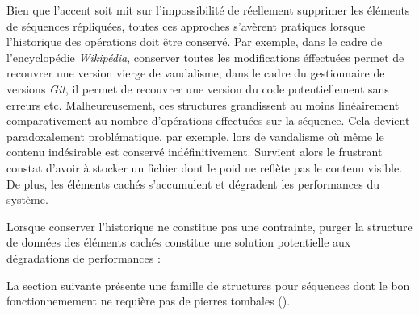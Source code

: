 Bien que l'accent soit mit sur l'impossibilité de réellement supprimer les
éléments de séquences répliquées, toutes ces approches s'avèrent pratiques
lorsque l'historique des opérations doit être conservé. Par exemple, dans le
cadre de l'encyclopédie \emph{Wikipédia}, conserver toutes les modifications
éffectuées permet de recouvrer une version vierge de vandalisme; dans le cadre
du gestionnaire de versions \emph{Git}, il permet de recouvrer une version du
code potentiellement sans erreurs etc. Malheureusement, ces structures
grandissent au moins linéairement comparativement au nombre d'opérations
effectuées sur la séquence. Cela devient paradoxalement problématique, par
exemple, lors de vandalisme où même le contenu indésirable est conservé
indéfinitivement. Survient alors le frustrant constat d'avoir à stocker un
fichier dont le poid ne reflète pas le contenu visible. De plus, les éléments
cachés s'accumulent et dégradent  les performances du
système.

Lorsque conserver l'historique ne constitue pas une contrainte, purger la
structure de données des éléments cachés constitue une solution potentielle aux
dégradations de performances :


La section suivante présente une famille de structures pour séquences dont le
bon fonctionnemement ne requière pas de pierres tombales ().

